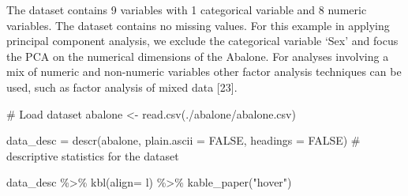 \documentclass[
  letterpaper,
  DIV=11,
  numbers=noendperiod]{scrreprt}
\newenvironment{Shaded}{\begin{snugshade}}{\end{snugshade}}
\newcommand{\AttributeTok}[1]{\textcolor[rgb]{0.40,0.45,0.13}{#1}}
\newcommand{\CommentTok}[1]{\textcolor[rgb]{0.37,0.37,0.37}{#1}}
\newcommand{\ConstantTok}[1]{\textcolor[rgb]{0.56,0.35,0.01}{#1}}
\newcommand{\FunctionTok}[1]{\textcolor[rgb]{0.28,0.35,0.67}{#1}}
\newcommand{\NormalTok}[1]{\textcolor[rgb]{0.00,0.23,0.31}{#1}}
\newcommand{\OtherTok}[1]{\textcolor[rgb]{0.00,0.23,0.31}{#1}}
\newcommand{\SpecialCharTok}[1]{\textcolor[rgb]{0.37,0.37,0.37}{#1}}
\newcommand{\StringTok}[1]{\textcolor[rgb]{0.13,0.47,0.30}{#1}}
\begin{document}
The dataset contains 9 variables with 1 categorical variable and 8
numeric variables. The dataset contains no missing values. For this
example in applying principal component analysis, we exclude the
categorical variable `Sex' and focus the PCA on the numerical dimensions
of the Abalone. For analyses involving a mix of numeric and non-numeric
variables other factor analysis techniques can be used, such as factor
analysis of mixed data {[}23{]}.

\begin{Shaded}
\begin{Highlighting}[]
\CommentTok{\# Load dataset}
\NormalTok{abalone }\OtherTok{\textless{}{-}} \FunctionTok{read.csv}\NormalTok{(}\StringTok{\textquotesingle{}./abalone/abalone.csv\textquotesingle{}}\NormalTok{)}

\NormalTok{data\_desc }\OtherTok{=} \FunctionTok{descr}\NormalTok{(abalone, }\AttributeTok{plain.ascii =} \ConstantTok{FALSE}\NormalTok{, }\AttributeTok{headings =} \ConstantTok{FALSE}\NormalTok{) }\CommentTok{\# descriptive statistics for the dataset}

\NormalTok{data\_desc }\SpecialCharTok{\%\textgreater{}\%}
  \FunctionTok{kbl}\NormalTok{(}\AttributeTok{align=} \StringTok{\textquotesingle{}l\textquotesingle{}}\NormalTok{) }\SpecialCharTok{\%\textgreater{}\%}
  \FunctionTok{kable\_paper}\NormalTok{(}\StringTok{"hover"}\NormalTok{)}
\end{Highlighting}
\end{Shaded}
\end{document}
